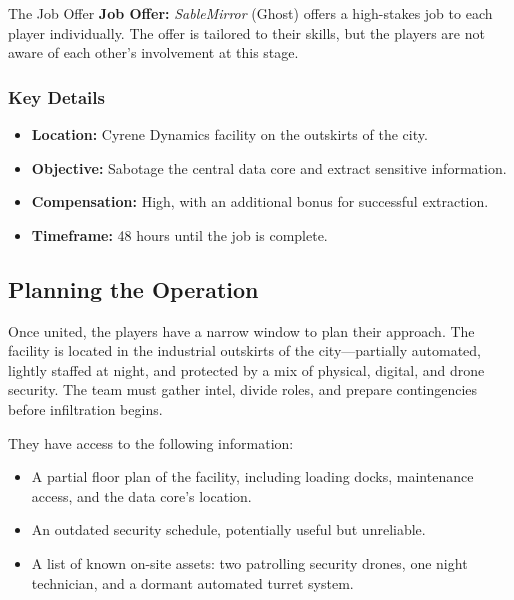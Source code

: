 \documentclass[nodeprecatedcode,bg=print]{dndbook}
\begin{document}
\begin{multicols}{2}
\begin{CommentBox}{The Job Offer}
    \textbf{Job Offer:} \emph{SableMirror} (Ghost) offers a high-stakes job to each player individually. The offer is tailored to their skills, but the players are not aware of each other’s involvement at this stage.

    \vspace{0.5\baselineskip}

    \subsubsection{Key Details}
    \begin{itemize}
        \item \textbf{Location:} Cyrene Dynamics facility on the outskirts of the city.
        \item \textbf{Objective:} Sabotage the central data core and extract sensitive information.
        \item \textbf{Compensation:} High, with an additional bonus for successful extraction.
        \item \textbf{Timeframe:} 48 hours until the job is complete.
    \end{itemize}
\end{CommentBox}

\subsection*{Planning the Operation}

Once united, the players have a narrow window to plan their approach. The facility is located in the industrial outskirts of the city—partially automated, lightly staffed at night, and protected by a mix of physical, digital, and drone security. The team must gather intel, divide roles, and prepare contingencies before infiltration begins.

They have access to the following information:
\begin{itemize}
    \item A partial floor plan of the facility, including loading docks, maintenance access, and the data core's location.
    \item An outdated security schedule, potentially useful but unreliable.
    \item A list of known on-site assets: two patrolling security drones, one night technician, and a dormant automated turret system.
\end{itemize}



\end{multicols}
\end{document}
